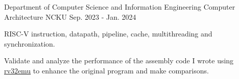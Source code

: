 \begin{cventries}
  \cventry
    {Department of Computer Science and Information Engineering} %
    {Computer Architecture} %
    {NCKU} %
    {Sep. 2023 - Jan. 2024} %
    {
      \begin{cvitems} %
        \item {RISC-V instruction, datapath, pipeline, cache, multithreading and synchronization.}
        \item {Validate and analyze the performance of the assembly code I wrote using \href{https://github.com/sysprog21/rv32emu}{rv32emu} to enhance the original program and make comparisons.}
      \end{cvitems}
    }
    
\end{cventries}
